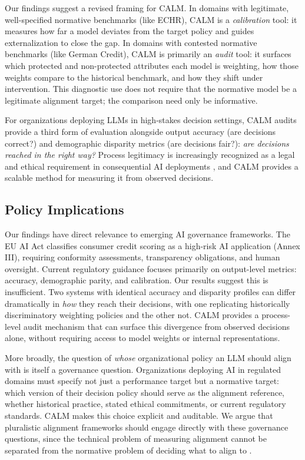 \documentclass{article}
\begin{document}
Our findings suggest a revised framing for CALM. In domains with legitimate, well-specified normative benchmarks (like ECHR), CALM is a \emph{calibration} tool: it measures how far a model deviates from the target policy and guides externalization to close the gap. In domains with contested normative benchmarks (like German Credit), CALM is primarily an \emph{audit} tool: it surfaces which protected and non-protected attributes each model is weighting, how those weights compare to the historical benchmark, and how they shift under intervention. This diagnostic use does not require that the normative model be a legitimate alignment target; the comparison need only be informative.

For organizations deploying LLMs in high-stakes decision settings, CALM audits provide a third form of evaluation alongside output accuracy (are decisions correct?) and demographic disparity metrics (are decisions fair?): \emph{are decisions reached in the right way?} Process legitimacy is increasingly recognized as a legal and ethical requirement in consequential AI deployments \citep{tyler1988psychology}, and CALM provides a scalable method for measuring it from observed decisions.

\subsection{Policy Implications}

Our findings have direct relevance to emerging AI governance frameworks. The EU AI Act classifies consumer credit scoring as a high-risk AI application (Annex III), requiring conformity assessments, transparency obligations, and human oversight. Current regulatory guidance focuses primarily on output-level metrics: accuracy, demographic parity, and calibration. Our results suggest this is insufficient. Two systems with identical accuracy and disparity profiles can differ dramatically in \emph{how} they reach their decisions, with one replicating historically discriminatory weighting policies and the other not. CALM provides a process-level audit mechanism that can surface this divergence from observed decisions alone, without requiring access to model weights or internal representations.

More broadly, the question of \emph{whose} organizational policy an LLM should align with is itself a governance question. Organizations deploying AI in regulated domains must specify not just a performance target but a normative target: which version of their decision policy should serve as the alignment reference, whether historical practice, stated ethical commitments, or current regulatory standards. CALM makes this choice explicit and auditable. We argue that pluralistic alignment frameworks should engage directly with these governance questions, since the technical problem of measuring alignment cannot be separated from the normative problem of deciding what to align to \citep{russell2019human,gabriel2020artificial}.
\end{document}
